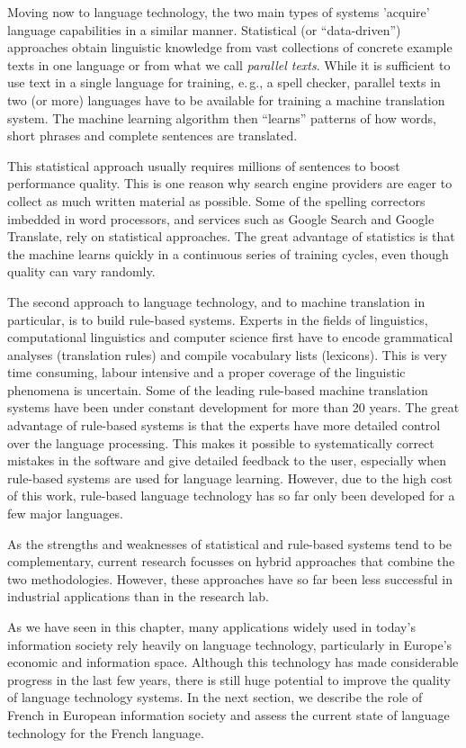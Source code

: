 \begin{multicols}{2}
Moving now to language technology, the two main types of systems
'acquire' language capabilities in a similar
manner. Statistical (or ``data-driven'') approaches
obtain linguistic knowledge from vast collections of concrete example
texts in one language or from what we call {\em parallel texts}. While
it is sufficient to use text in a single language for training,
e.\,g., a spell checker, parallel texts in two (or more) languages
have to be available for training a machine translation system. The
machine learning algorithm then ``learns'' patterns of
how words, short phrases and complete sentences are translated.

This statistical approach usually requires millions of sentences to boost performance quality. This is one reason why search engine providers are eager to collect as much written material as possible. Some of the spelling correctors imbedded in word processors, and services such as Google Search and Google Translate, rely on statistical approaches. The great advantage of statistics is that the machine learns quickly in a continuous series of training cycles, even though quality can vary randomly.

The second approach to language technology, and to machine translation in particular, is to build rule-based systems. Experts in the fields of linguistics, computational linguistics and computer science first have to encode grammatical analyses (translation rules) and compile vocabulary lists (lexicons). This is very time consuming, labour intensive and a proper coverage of the linguistic phenomena is uncertain. Some of the leading rule-based machine translation systems have been under constant development for more than 20 years. The great advantage of rule-based systems is that the experts have more detailed control over the language processing. This makes it possible to systematically correct mistakes in the software and give detailed feedback to the user, especially when rule-based systems are used for language learning. However, due to the high cost of this work, rule-based language technology has so far only been developed for a few major languages. 


As the strengths and weaknesses of statistical and rule-based systems tend to be complementary, current research focusses on hybrid approaches that combine the two methodologies. However, these approaches have so far been less successful in industrial applications than in the research lab. 

As we have seen in this chapter, many applications widely used in
today's information society rely heavily on language technology,
particularly in Europe's economic and information space. Although this
technology has made considerable progress in the last few years, there
is still huge potential to improve the quality of language technology
systems. In the next section, we describe the role of French in
European information society and assess the current state of language
technology for the French language.
\end{multicols}

